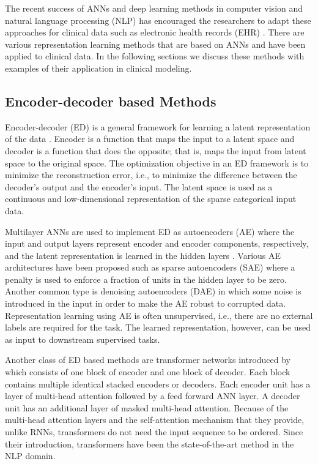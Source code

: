 The recent success of ANNs and deep learning methods in computer vision and natural language processing (NLP) has encouraged the researchers to adapt these approaches for clinical data such as electronic health records (EHR) \cite{Xiao2018}. There are various representation learning methods that are based on ANNs and have been applied to clinical data. In the following sections we discuss these methods with examples of their application in clinical modeling.

\subsection{Encoder-decoder based Methods}
Encoder-decoder (ED) is a general framework for learning a latent representation of the data \cite{Hinton2006}. Encoder is a function that maps the input to a latent space and decoder is a function that does the opposite; that is, maps the input from latent space to the original space. The optimization objective in an ED framework is to minimize the reconstruction error, i.e., to minimize the difference between the decoder's output and the encoder's input. The latent space is used as a continuous and low-dimensional representation of the sparse categorical input data.

Multilayer ANNs are used to implement ED as autoencoders (AE) where the input and output layers represent encoder and encoder components, respectively, and the latent representation is learned in the hidden layers \cite{Hinton2006, Vincent2008}. Various AE architectures have been proposed such as sparse autoencoders (SAE) where a penalty is used to enforce a fraction of units in the hidden layer to be zero. Another common type is denoising autoencoders (DAE) in which some noise is introduced in the input in order to make the AE robust to corrupted data. Representation learning using AE is often unsupervised, i.e., there are no external labels are required for the task. The learned representation, however, can be used as input to downstream supervised tasks.

Another class of ED based methods are transformer networks introduced by \cite{Vaswani2017transformers} which consists of one block of encoder and one block of decoder. Each block contains multiple identical stacked encoders or decoders. Each encoder unit has a layer of multi-head attention followed by a feed forward ANN layer. A decoder unit has an additional layer of masked multi-head attention. Because of the multi-head attention layers and  the self-attention mechanism that they provide, unlike RNNs, transformers do not need the input sequence to be ordered. Since their introduction, transformers have been the state-of-the-art method in the NLP domain.

